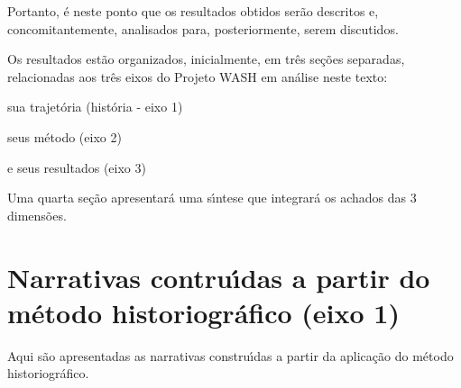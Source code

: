 \documentclass[
12pt,		%
openright,	%
twoside,  %
a4paper,			%
chapter=TITLE,		%
english,			%
french,				%
spanish,			%
brazil				%
]{USPSC-classe/USPSC}
\begin{document}
Portanto, \'e neste ponto que os resultados obtidos ser\~ao descritos e, concomitantemente, analisados para, posteriormente, serem discutidos.














Os resultados est\~ao organizados, inicialmente, em tr\^es se\c{c}\~oes separadas, relacionadas aos tr\^es eixos do Projeto WASH em an\'alise neste texto:















\begin{alineas}
\item sua trajet\'oria (hist\'oria - eixo 1)
\item seus m\'etodo (eixo 2)
\item e seus resultados (eixo 3)
\end{alineas}

Uma quarta se\c{c}\~ao apresentar\'a uma s\'{\i}ntese que integrar\'a os achados das 3 dimens\~oes.














\section[Narrativas contru\'{\i}das a partir do m\'etodo historiogr\'afico (eixo 1)]{Narrativas contru\'{\i}das a partir do m\'etodo historiogr\'afico (eixo 1)}\label{Narrativas contru\'{\i}das a partir do m\'etodo historiogr\'afico (eixo 1)}
Aqui s\~ao apresentadas as narrativas constru\'{\i}das a partir da aplica\c{c}\~ao do m\'etodo historiogr\'afico.
\end{document}
